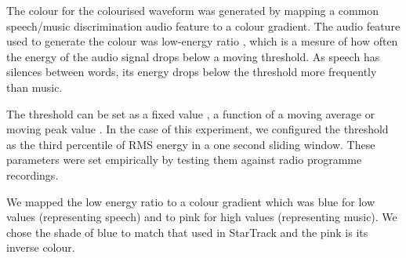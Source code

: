 The colour for the colourised waveform was generated by mapping a common speech/music discrimination audio feature to a
colour gradient. The audio feature used to generate the colour was low-energy ratio \citep{Panagiotakis2005}, which is
a mesure of how often the energy of the audio signal drops below a moving threshold. As speech has silences between
words, its energy drops below the threshold more frequently than music.

The threshold can be set as a fixed value \citep{Liang2005}, a function of a moving average \citep{Ericsson2009} or
moving peak value \citep{Saunders1996}.  In the case of this experiment, we configured the threshold as the third
percentile of RMS energy in a one second sliding window. These parameters were set empirically by testing them against
radio programme recordings.

We mapped the low energy ratio to a colour gradient which was blue for low values (representing speech) and to pink
for high values (representing music). We chose the shade of blue to match that used in StarTrack and the pink is
its inverse colour.









